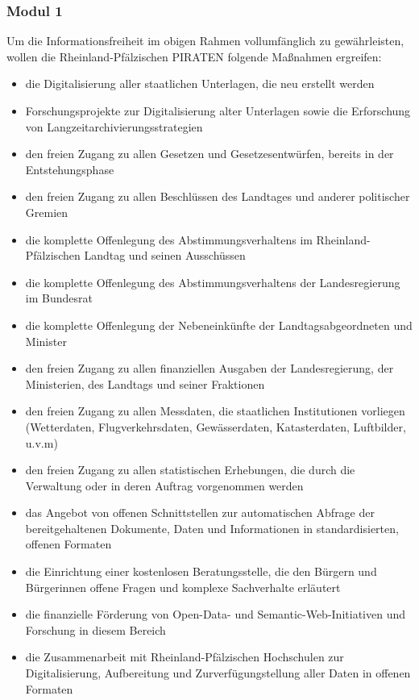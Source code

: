 \subsubsection{Modul 1}
\abstimmung
Um die Informationsfreiheit im obigen Rahmen vollumfänglich zu gewährleisten, wollen die Rheinland-Pfälzischen PIRATEN folgende Maßnahmen ergreifen:
\begin{itemize}
\item die Digitalisierung aller staatlichen Unterlagen, die neu erstellt werden
\item Forschungsprojekte zur Digitalisierung alter Unterlagen sowie die Erforschung von Langzeitarchivierungsstrategien
\item den freien Zugang zu allen Gesetzen und Gesetzesentwürfen, bereits in der Entstehungsphase
\item den freien Zugang zu allen Beschlüssen des Landtages und anderer politischer Gremien
\item die komplette Offenlegung des Abstimmungsverhaltens im Rheinland-Pfälzischen Landtag und seinen Ausschüssen
\item die komplette Offenlegung des Abstimmungsverhaltens der Landesregierung im Bundesrat
\item die komplette Offenlegung der Nebeneinkünfte der Landtagsabgeordneten und Minister
\item den freien Zugang zu allen finanziellen Ausgaben der Landesregierung, der Ministerien, des Landtags und seiner Fraktionen
\item den freien Zugang zu allen Messdaten, die staatlichen Institutionen vorliegen (Wetterdaten, Flugverkehrsdaten, Gewässerdaten, Katasterdaten, Luftbilder, u.v.m)
\item den freien Zugang zu allen statistischen Erhebungen, die durch die Verwaltung oder in deren Auftrag vorgenommen werden
\item das Angebot von offenen Schnittstellen zur automatischen Abfrage der bereitgehaltenen Dokumente, Daten und Informationen in standardisierten, offenen Formaten
\item die Einrichtung einer kostenlosen Beratungsstelle, die den Bürgern und Bürgerinnen offene Fragen und komplexe Sachverhalte erläutert
\item die finanzielle Förderung von Open-Data- und Semantic-Web-Initiativen und Forschung in diesem Bereich
\item die Zusammenarbeit mit Rheinland-Pfälzischen Hochschulen zur Digitalisierung, Aufbereitung und Zurverfügungstellung aller Daten in offenen Formaten

\end{itemize}
